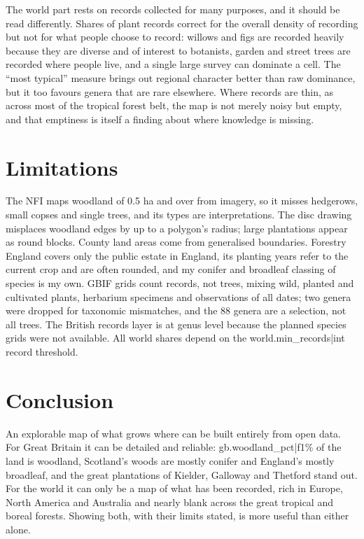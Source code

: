 \documentclass[11pt,a4paper]{article}
\begin{document}
The world part rests on records collected for many purposes, and it should be read differently. Shares of plant records correct for the overall density of recording but not for what people choose to record: willows and figs are recorded heavily because they are diverse and of interest to botanists, garden and street trees are recorded where people live, and a single large survey can dominate a cell. The ``most typical'' measure brings out regional character better than raw dominance, but it too favours genera that are rare elsewhere. Where records are thin, as across most of the tropical forest belt, the map is not merely noisy but empty, and that emptiness is itself a finding about where knowledge is missing.

\section{Limitations}

The NFI maps woodland of 0.5 ha and over from imagery, so it misses hedgerows, small copses and single trees, and its types are interpretations. The disc drawing misplaces woodland edges by up to a polygon's radius; large plantations appear as round blocks. County land areas come from generalised boundaries. Forestry England covers only the public estate in England, its planting years refer to the current crop and are often rounded, and my conifer and broadleaf classing of species is my own. GBIF grids count records, not trees, mixing wild, planted and cultivated plants, herbarium specimens and observations of all dates; two genera were dropped for taxonomic mismatches, and the 88 genera are a selection, not all trees. The British records layer is at genus level because the planned species grids were not available. All world shares depend on the {{world.min_records|int}} record threshold.

\section{Conclusion}

An explorable map of what grows where can be built entirely from open data. For Great Britain it can be detailed and reliable: {{gb.woodland_pct|f1}}\% of the land is woodland, Scotland's woods are mostly conifer and England's mostly broadleaf, and the great plantations of Kielder, Galloway and Thetford stand out. For the world it can only be a map of what has been recorded, rich in Europe, North America and Australia and nearly blank across the great tropical and boreal forests. Showing both, with their limits stated, is more useful than either alone.
\end{document}
